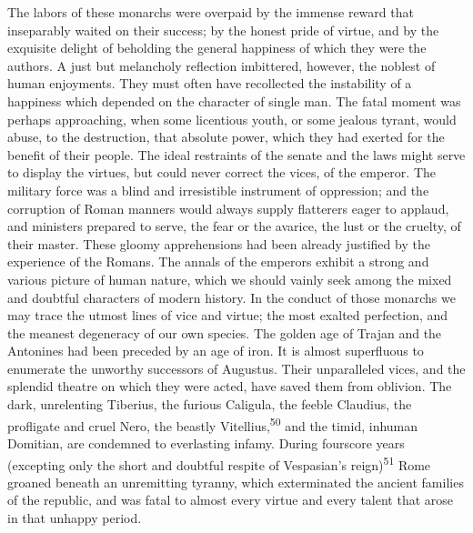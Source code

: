 The labors of these monarchs were overpaid by the immense reward
that inseparably waited on their success; by the honest pride of
virtue, and by the exquisite delight of beholding the general
happiness of which they were the authors. A just but melancholy
reflection imbittered, however, the noblest of human enjoyments.
They must often have recollected the instability of a happiness
which depended on the character of single man. The fatal moment
was perhaps approaching, when some licentious youth, or some
jealous tyrant, would abuse, to the destruction, that absolute
power, which they had exerted for the benefit of their people.
The ideal restraints of the senate and the laws might serve to
display the virtues, but could never correct the vices, of the
emperor. The military force was a blind and irresistible
instrument of oppression; and the corruption of Roman manners
would always supply flatterers eager to applaud, and ministers
prepared to serve, the fear or the avarice, the lust or the
cruelty, of their master. These gloomy apprehensions had been
already justified by the experience of the Romans. The annals of
the emperors exhibit a strong and various picture of human
nature, which we should vainly seek among the mixed and doubtful
characters of modern history. In the conduct of those monarchs we
may trace the utmost lines of vice and virtue; the most exalted
perfection, and the meanest degeneracy of our own species. The
golden age of Trajan and the Antonines had been preceded by an
age of iron. It is almost superfluous to enumerate the unworthy
successors of Augustus. Their unparalleled vices, and the
splendid theatre on which they were acted, have saved them from
oblivion. The dark, unrelenting Tiberius, the furious Caligula,
the feeble Claudius, the profligate and cruel Nero, the beastly
Vitellius,\textsuperscript{50} and the timid, inhuman Domitian, are condemned to
everlasting infamy. During fourscore years (excepting only the
short and doubtful respite of Vespasian’s reign)\textsuperscript{51} Rome groaned
beneath an unremitting tyranny, which exterminated the ancient
families of the republic, and was fatal to almost every virtue
and every talent that arose in that unhappy period.


